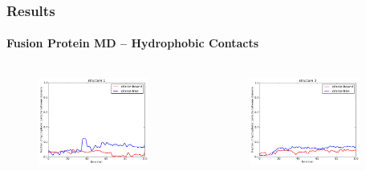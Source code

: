 \documentclass[english]{beamer}
\begin{document}
\begin{frame}
    \frametitle{Results}
    \framesubtitle{Fusion Protein MD -- Hydrophobic Contacts}  

    \vspace{0.06\topmargin}

    \begin{columns}[t]
        \vspace{-4ex}
        \begin{figure}
            \includegraphics[width=0.85\textwidth]{figures/Complex_hydrophobic_core/hydrophobic_cont_structure1.pdf}  
        \end{figure}      
        \vspace{-5ex}
        \begin{figure}
            \includegraphics[width=0.85\textwidth]{figures/Complex_hydrophobic_core/hydrophobic_cont_structure3.pdf}  
        \end{figure}       


\end{columns}
\end{frame}
\end{document}
